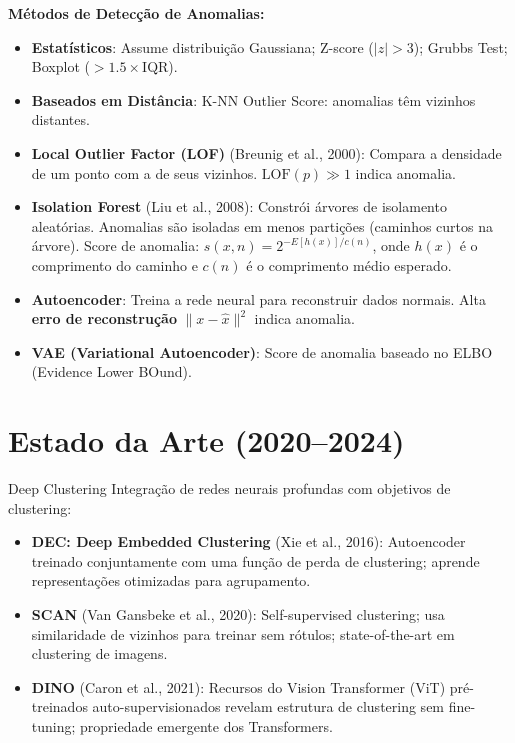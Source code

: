 \documentclass[12pt,a4paper]{article}
\begin{document}
\textbf{Métodos de Detecção de Anomalias:}

\begin{itemize}
  \item \textbf{Estatísticos}: Assume distribuição Gaussiana; Z-score ($|z| > 3$); Grubbs Test; Boxplot ($> 1.5 \times \text{IQR}$).
  \item \textbf{Baseados em Distância}: K-NN Outlier Score: anomalias têm vizinhos distantes.
  \item \textbf{Local Outlier Factor (LOF)} (Breunig et al., 2000): Compara a densidade de um ponto com a de seus vizinhos. $\text{LOF}(p) \gg 1$ indica anomalia.
  \item \textbf{Isolation Forest} (Liu et al., 2008): Constrói árvores de isolamento aleatórias. Anomalias são isoladas em menos partições (caminhos curtos na árvore). Score de anomalia: $s(x,n) = 2^{-E[h(x)]/c(n)}$, onde $h(x)$ é o comprimento do caminho e $c(n)$ é o comprimento médio esperado.
  \item \textbf{Autoencoder}: Treina a rede neural para reconstruir dados normais. Alta \textbf{erro de reconstrução} $\|x - \hat{x}\|^2$ indica anomalia.
  \item \textbf{VAE (Variational Autoencoder)}: Score de anomalia baseado no ELBO (Evidence Lower BOund).
\end{itemize}

\section{Estado da Arte (2020--2024)}

\begin{estadoartebox}{Deep Clustering}
Integração de redes neurais profundas com objetivos de clustering:
\begin{itemize}
  \item \textbf{DEC: Deep Embedded Clustering} (Xie et al., 2016): Autoencoder treinado conjuntamente com uma função de perda de clustering; aprende representações otimizadas para agrupamento.
  \item \textbf{SCAN} (Van Gansbeke et al., 2020): Self-supervised clustering; usa similaridade de vizinhos para treinar sem rótulos; state-of-the-art em clustering de imagens.
  \item \textbf{DINO} (Caron et al., 2021): Recursos do Vision Transformer (ViT) pré-treinados auto-supervisionados revelam estrutura de clustering sem fine-tuning; propriedade emergente dos Transformers.
\end{itemize}
\end{estadoartebox}
\end{document}
